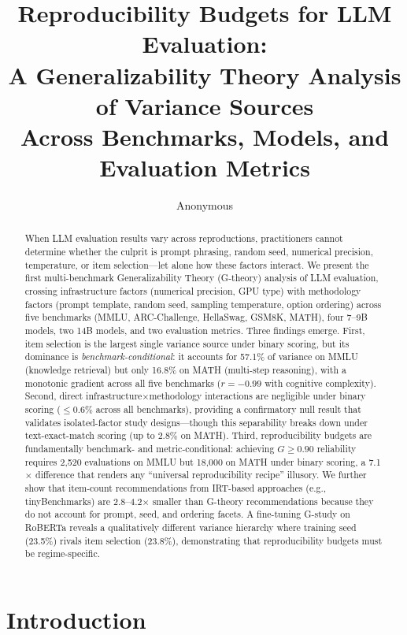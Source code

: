 \documentclass[11pt,twocolumn]{article}
\title{Reproducibility Budgets for LLM Evaluation:\\A Generalizability Theory Analysis of Variance Sources\\Across Benchmarks, Models, and Evaluation Metrics}
\author{Anonymous}
\date{}
\begin{document}
\maketitle

\begin{abstract}
When LLM evaluation results vary across reproductions, practitioners cannot determine whether the culprit is prompt phrasing, random seed, numerical precision, temperature, or item selection---let alone how these factors interact.
We present the first multi-benchmark Generalizability Theory (G-theory) analysis of LLM evaluation, crossing infrastructure factors (numerical precision, GPU type) with methodology factors (prompt template, random seed, sampling temperature, option ordering) across five benchmarks (MMLU, ARC-Challenge, HellaSwag, GSM8K, MATH), four 7--9B models, two 14B models, and two evaluation metrics.
Three findings emerge.
First, item selection is the largest single variance source under binary scoring, but its dominance is \emph{benchmark-conditional}: it accounts for 57.1\% of variance on MMLU (knowledge retrieval) but only 16.8\% on MATH (multi-step reasoning), with a monotonic gradient across all five benchmarks ($r=-0.99$ with cognitive complexity).
Second, direct infrastructure$\times$methodology interactions are negligible under binary scoring ($\leq$0.6\% across all benchmarks), providing a confirmatory null result that validates isolated-factor study designs---though this separability breaks down under text-exact-match scoring (up to 2.8\% on MATH).
Third, reproducibility budgets are fundamentally benchmark- and metric-conditional: achieving $G\geq0.90$ reliability requires 2{,}520 evaluations on MMLU but 18{,}000 on MATH under binary scoring, a 7.1$\times$ difference that renders any ``universal reproducibility recipe'' illusory.
We further show that item-count recommendations from IRT-based approaches (e.g., tinyBenchmarks) are 2.8--4.2$\times$ smaller than G-theory recommendations because they do not account for prompt, seed, and ordering facets.
A fine-tuning G-study on RoBERTa reveals a qualitatively different variance hierarchy where training seed (23.5\%) rivals item selection (23.8\%), demonstrating that reproducibility budgets must be regime-specific.
\end{abstract}

\section{Introduction}
\end{document}
